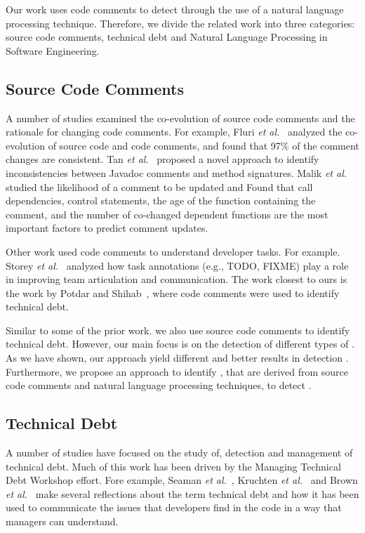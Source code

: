 Our work uses code comments to detect \SATD through the use of a natural language processing technique. Therefore, we divide the related work into three categories: source code comments, technical debt and Natural Language Processing in Software Engineering.

\subsection{Source Code Comments}

A number of studies examined the co-evolution of source code comments and the rationale for changing code comments. For example, Fluri \textit{et al.}~\cite{Fluri2007WCRE} analyzed the co-evolution of source code and code comments, and found that 97\% of the comment changes are consistent. Tan \textit{et al.}~\cite{Tan2012ICST} proposed a novel approach to identify inconsistencies between Javadoc comments and method signatures. Malik \textit{et al.} \cite{Malik2008ICSM} studied the likelihood of a comment to be updated and Found that   call dependencies, control statements, the age of the function containing the comment, and the number of co-changed dependent functions are the most important factors to predict comment updates.

Other work used code comments to understand developer tasks. For example. Storey \textit{et al.}~\cite{Storey2008ICSE} analyzed how task annotations (e.g., TODO, FIXME) play a role in improving team articulation and communication. The work closest to ours is the work by Potdar and Shihab~\cite{Potdar2014ICSME}, where code comments were used to identify technical debt. 

Similar to some of the prior work. we also use source code comments to identify technical debt. However, our main focus is on the detection of different types of \SATD. As we have shown, our approach yield different and better results in detection \SATD. Furthermore, we propose an approach to identify \SATD, that are derived from source code comments and natural language processing techniques, to detect \SATD.

\subsection{Technical Debt}

A number of studies have focused on the study of, detection and management of technical debt. Much of this work has been driven by the Managing Technical Debt Workshop effort. Fore example, Seaman \textit{et al.}~\cite{Seaman2011}, Kruchten \textit{et al.}~\cite{Kruchten2013IWMTD} and Brown \textit{et al.}~\cite{Brown2010MTD} make several reflections about the term technical debt and how it has been used to communicate the issues that developers find in the code in a way that managers can understand. 

